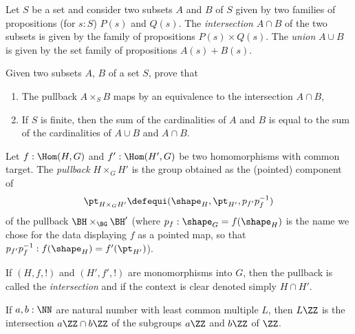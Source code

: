 \begin{definition}
  \label{def:intersectionand unionofsets}
  Let $S$ be a set and consider two subsets $A$ and $B$ of $S$ given by two families of propositions (for $s:S$) $P(s)$ and $Q(s)$.  The \emph{intersection} $A\cap B$ of the two subsets is given by the family of propositions $P(s)\times Q(s)$.  The \emph{union} $A\cup B$ is given by the set family of propositions $A(s)+B(s)$.
\end{definition}
\begin{xca}
  \label{xca:intersectionpullbackofsets}
  Given two subsets $A$, $B$ of a set $S$, prove that
  \begin{enumerate}
  \item The pullback $A\times_SB$ maps by an equivalence to the intersection $A\cap B$,
  \item\label{xca:cardinalityintersectionunion}
    If $S$ is finite, then the sum of the cardinalities of $A$ and $B$ is equal to the sum of the cardinalities of $A\cup B$ and $A\cap B$.\qedhere
  \end{enumerate}
\end{xca}

\begin{definition}
  \label{def:intersectionofgroups}
  Let $f:\Hom(H,G)$ and $f':\Hom(H',G)$ be two homomorphisms with common target.  The \emph{pullback} $H\times_GH'$ is the group obtained as the (pointed) component of
$$\pt_{H\times_GH'}\defequi(\shape_H,\pt_{H'},p_{f'}p_f^{-1})$$ of the pullback $\BH\times_{\BG}\BH'$ (where $p_f:\shape_G=f(\shape_H)$ is the name we chose for the data displaying $f$ as a pointed map, so that $p_{f'}p_f^{-1}:f(\shape_H)=f'(\pt_{H'})$).

If $(H,f,!)$ and $(H',f',!)$ are monomorphisms into $G$, then the pullback is called the \emph{intersection} and if the context is clear denoted simply $H\cap H'$.
\end{definition}
\begin{example}
  If $a,b:\NN$ are natural number with least common multiple $L$, then $L\ZZ$ is the intersection $a\ZZ\cap b\ZZ$ of the subgroups $a\ZZ$ and $b\ZZ$ of $\ZZ$.
\end{example}

